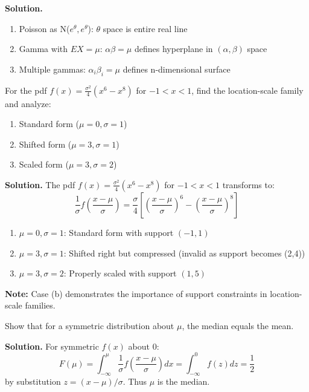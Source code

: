\noindent\textbf{Solution.}
\begin{enumerate}[label=(\alph*)]
\item Poisson as N($e^\theta,e^\theta$): $\theta$ space is entire real line

\item Gamma with $EX = \mu$: $\alpha\beta = \mu$ defines hyperplane in $(\alpha,\beta)$ space

\item Multiple gammas: $\alpha_i\beta_i = \mu$ defines n-dimensional surface
\end{enumerate}

\begin{problembox}
For the pdf $f(x) = \frac{\sigma^2}{4}(x^6 - x^8)$ for $-1 < x < 1$, find the location-scale family and analyze:
\begin{enumerate}[label=(\alph*)]
\item Standard form ($\mu=0,\sigma=1$)
\item Shifted form ($\mu=3,\sigma=1$)
\item Scaled form ($\mu=3,\sigma=2$)
\end{enumerate}
\end{problembox}

\noindent\textbf{Solution.}
The pdf $f(x) = \frac{\sigma^2}{4}(x^6 - x^8)$ for $-1 < x < 1$ transforms to:
\[
\frac{1}{\sigma}f\left(\frac{x-\mu}{\sigma}\right) = \frac{\sigma}{4}\left[\left(\frac{x-\mu}{\sigma}\right)^6 - \left(\frac{x-\mu}{\sigma}\right)^8\right]
\]
\begin{enumerate}[label=(\alph*)]
\item $\mu=0,\sigma=1$: Standard form with support $(-1,1)$
\item $\mu=3,\sigma=1$: Shifted right but compressed (invalid as support becomes (2,4))
\item $\mu=3,\sigma=2$: Properly scaled with support $(1,5)$
\end{enumerate}
\textbf{Note:} Case (b) demonstrates the importance of support constraints in location-scale families.

\begin{problembox}
Show that for a symmetric distribution about $\mu$, the median equals the mean.
\end{problembox}

\noindent\textbf{Solution.}
For symmetric $f(x)$ about 0:
\[
F(\mu) = \int_{-\infty}^\mu \frac{1}{\sigma}f\left(\frac{x-\mu}{\sigma}\right)dx = \int_{-\infty}^0 f(z)dz = \frac{1}{2}
\]
by substitution $z = (x-\mu)/\sigma$. Thus $\mu$ is the median.

